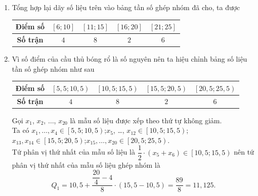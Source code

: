 \begin{bt}
{\begin{enumerate}
\begin{center}
\begin{tabular}{|c|c|c|c|c|c|c|c|c|c|}
					\hline 
					$ 14 $	& $ 15 $ & $ 18 $ & $ 18 $ & $ 21 $ & $ 22 $ & $ 23 $ & $ 24 $ & $ 25 $ & $ 25 $\\
					\hline 
				\end{tabular} 
			\end{center}
			Tứ phân vị thứ nhất của mẫu số liệu là $\dfrac{1}{2}\cdot\left( x_{5}+x_6\right) =\dfrac{1}{2}\cdot\left( 11+11\right)=11$.\\
			Tứ phân vị thứ hai của mẫu số liệu là $\dfrac{1}{2}\cdot\left( x_{10}+x_{11}\right)=\dfrac{1}{2}\cdot\left( 14+14\right)=14$.\\
			Tứ phân vị thứ ba của mẫu số liệu là $\dfrac{1}{2}\cdot\left( x_{15}+x_{16}\right)=\dfrac{1}{2}\cdot\left( 21+22\right)=21{,}5$.
			\item Tổng hợp lại dãy số liệu trên vào bảng tần số ghép nhóm đã cho, ta được
			\begin{center}
				\begin{tabular}{|c|c|c|c|c|}
					\hline 
					\textbf{Điểm số}	& $\left[ 6;10\right] $ & $\left[ 11;15\right] $ & $\left[16;20\right] $ & $\left[ 21;25\right] $\\ 
					\hline 
					\textbf{Số trận}	& $ 4 $ & $ 8 $ & $ 2 $ & $ 6 $\\ 
					\hline 
				\end{tabular} 
			\end{center}
			\item Vì số điểm của cầu thủ bóng rổ là số nguyên nên ta hiệu chỉnh bảng số liệu tần số ghép nhóm như sau
			\begin{center}
				\begin{tabular}{|c|c|c|c|c|}
					\hline 
					\textbf{Điểm số}	& $\left[ 5{,}5;10{,}5\right) $ & $\left[ 10{,}5;15{,}5\right) $ & $\left[15{,}5;20{,}5\right) $ & $\left[ 20{,}5;25{,}5\right) $\\ 
					\hline 
					\textbf{Số trận}	& $ 4 $ & $ 8 $ & $ 2 $ & $ 6 $\\ 
					\hline 
				\end{tabular} 
			\end{center}
			Gọi $ x_1 $, $ x_2 $, $\ldots $, $ x_{20} $ là mẫu số liệu được xếp theo thứ tự không giảm.\\
			Ta có $ x_1,\ldots, x_4\in \left[ 5{,}5;10{,}5\right) $;$ x_5$, \ldots, $x_{12}\in \left[ 10{,}5;15{,}5\right)$;$ x_{13}, x_{14}\in \left[15{,}5;20{,}5\right) $;$ x_{15},\ldots, x_{20}\in \left[ 20{,}5;25{,}5\right) $.\\
			Tứ phân vị thứ nhất của mẫu số liệu là $\dfrac{1}{2}\cdot\left( x_{5}+x_6\right)\in\left[ 10{,}5;15{,}5\right)$ nên tứ phân vị thứ nhất của mẫu số liệu ghép nhóm là $$Q_1=10{,}5 +\dfrac{\dfrac{20}{4}-4}{8}\cdot\left(15{,}5-10{,}5\right)=\dfrac{89}{8}=11{,}125.$$

\end{enumerate}}
\end{bt}
